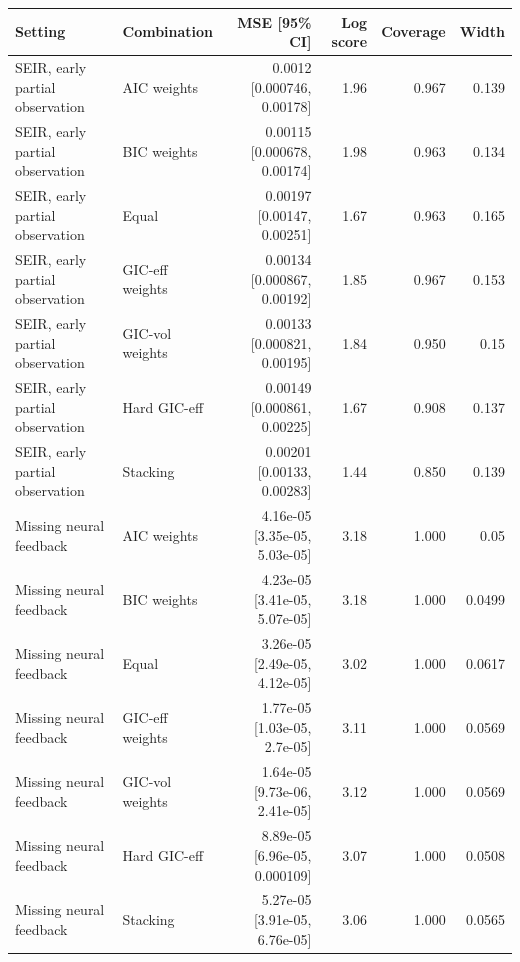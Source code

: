 \begin{tabular}{llrrrr}
\toprule
Setting & Combination & MSE [95\% CI] & Log score & Coverage & Width\\
\midrule
SEIR, early partial observation & AIC weights & 0.0012 [0.000746, 0.00178] & 1.96 & 0.967 & 0.139\\
SEIR, early partial observation & BIC weights & 0.00115 [0.000678, 0.00174] & 1.98 & 0.963 & 0.134\\
SEIR, early partial observation & Equal & 0.00197 [0.00147, 0.00251] & 1.67 & 0.963 & 0.165\\
SEIR, early partial observation & GIC-eff weights & 0.00134 [0.000867, 0.00192] & 1.85 & 0.967 & 0.153\\
SEIR, early partial observation & GIC-vol weights & 0.00133 [0.000821, 0.00195] & 1.84 & 0.950 & 0.15\\
SEIR, early partial observation & Hard GIC-eff & 0.00149 [0.000861, 0.00225] & 1.67 & 0.908 & 0.137\\
SEIR, early partial observation & Stacking & 0.00201 [0.00133, 0.00283] & 1.44 & 0.850 & 0.139\\
Missing neural feedback & AIC weights & 4.16e-05 [3.35e-05, 5.03e-05] & 3.18 & 1.000 & 0.05\\
Missing neural feedback & BIC weights & 4.23e-05 [3.41e-05, 5.07e-05] & 3.18 & 1.000 & 0.0499\\
Missing neural feedback & Equal & 3.26e-05 [2.49e-05, 4.12e-05] & 3.02 & 1.000 & 0.0617\\
Missing neural feedback & GIC-eff weights & 1.77e-05 [1.03e-05, 2.7e-05] & 3.11 & 1.000 & 0.0569\\
Missing neural feedback & GIC-vol weights & 1.64e-05 [9.73e-06, 2.41e-05] & 3.12 & 1.000 & 0.0569\\
Missing neural feedback & Hard GIC-eff & 8.89e-05 [6.96e-05, 0.000109] & 3.07 & 1.000 & 0.0508\\
Missing neural feedback & Stacking & 5.27e-05 [3.91e-05, 6.76e-05] & 3.06 & 1.000 & 0.0565\\
\bottomrule
\end{tabular}
